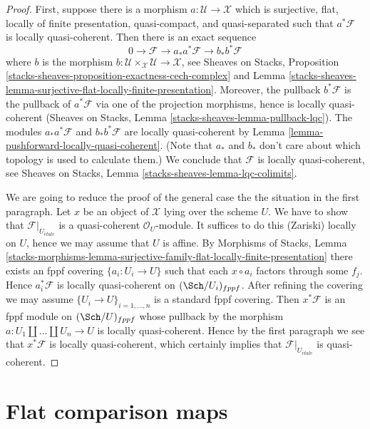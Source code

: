 \begin{proof}
First, suppose there is a morphism $a : \mathcal{U} \to \mathcal{X}$
which is surjective, flat, locally of finite presentation, quasi-compact,
and quasi-separated such that $a^*\mathcal{F}$ is locally quasi-coherent.
Then there is an exact sequence
$$
0 \to \mathcal{F} \to a_*a^*\mathcal{F} \to b_*b^*\mathcal{F}
$$
where $b$ is the morphism
$b : \mathcal{U} \times_\mathcal{X} \mathcal{U} \to \mathcal{X}$, see
Sheaves on Stacks, Proposition
\ref{stacks-sheaves-proposition-exactness-cech-complex} and
Lemma \ref{stacks-sheaves-lemma-surjective-flat-locally-finite-presentation}.
Moreover, the pullback $b^*\mathcal{F}$ is the pullback of $a^*\mathcal{F}$
via one of the projection morphisms, hence is locally quasi-coherent
(Sheaves on Stacks, Lemma \ref{stacks-sheaves-lemma-pullback-lqc}).
The modules $a_*a^*\mathcal{F}$ and $b_*b^*\mathcal{F}$ are locally
quasi-coherent by Lemma \ref{lemma-pushforward-locally-quasi-coherent}.
(Note that $a_*$ and $b_*$ don't care about which topology is
used to calculate them.)
We conclude that $\mathcal{F}$ is locally quasi-coherent, see
Sheaves on Stacks, Lemma \ref{stacks-sheaves-lemma-lqc-colimits}.

\medskip\noindent
We are going to reduce the proof of the general case the the
situation in the first paragraph. Let $x$ be an object of $\mathcal{X}$
lying over the scheme $U$. We have to show that
$\mathcal{F}|_{U_{\acute{e}tale}}$ is a quasi-coherent $\mathcal{O}_U$-module.
It suffices to do this (Zariski) locally on $U$, hence we may
assume that $U$ is affine. By
Morphisms of Stacks, Lemma
\ref{stacks-morphisms-lemma-surjective-family-flat-locally-finite-presentation}
there exists an fppf covering $\{a_i : U_i \to U\}$ such that
each $x \circ a_i$ factors through some $f_j$. Hence $a_i^*\mathcal{F}$
is locally quasi-coherent on $(\Sch/U_i)_{fppf}$. After refining
the covering we may assume $\{U_i \to U\}_{i = 1, \ldots, n}$
is a standard fppf covering. Then $x^*\mathcal{F}$ is an fppf
module on $(\Sch/U)_{fppf}$ whose pullback by the morphism
$a : U_1 \amalg \ldots \amalg U_n \to U$ is locally quasi-coherent.
Hence by the first paragraph we see that $x^*\mathcal{F}$ is locally
quasi-coherent, which certainly implies that $\mathcal{F}|_{U_{\acute{e}tale}}$
is quasi-coherent.
\end{proof}






\section{Flat comparison maps}
\label{section-flat-comparison}

